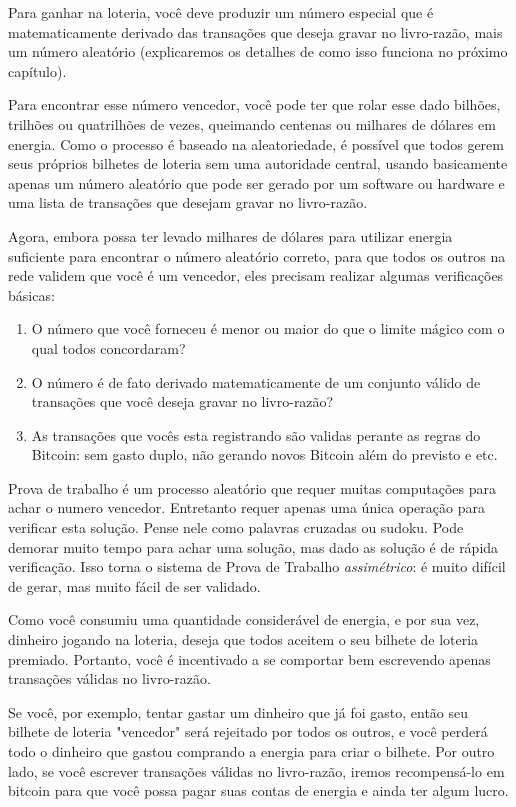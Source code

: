 Para ganhar na loteria, você deve produzir um número especial que é matematicamente derivado das transações que deseja gravar no livro-razão, mais um número aleatório (explicaremos os detalhes de como isso funciona no próximo capítulo).

Para encontrar esse número vencedor, você pode ter que rolar esse dado bilhões, trilhões ou quatrilhões de vezes, queimando centenas ou milhares de dólares em energia. Como o processo é baseado na aleatoriedade, é possível que todos gerem seus próprios bilhetes de loteria sem uma autoridade central, usando basicamente apenas um número aleatório que pode ser gerado por um software ou hardware e uma lista de transações que desejam gravar no livro-razão.

Agora, embora possa ter levado milhares de dólares para utilizar energia suficiente para encontrar o número aleatório correto, para que todos os outros na rede validem que você é um vencedor, eles precisam realizar algumas verificações básicas:

\begin{samepage}
\begin{enumerate}
\item O número que você forneceu é menor ou maior do que o limite mágico com o qual todos concordaram?
\item O número é de fato derivado matematicamente de um conjunto válido de transações que você deseja gravar no livro-razão?
\item As transações que vocês esta registrando são validas perante as regras do Bitcoin: sem gasto duplo, não gerando novos Bitcoin além do previsto e etc.
\end{enumerate}
\end{samepage}
Prova de trabalho é um processo aleatório que requer muitas computações para achar o numero vencedor. Entretanto requer apenas uma única operação para verificar esta solução. Pense nele como palavras cruzadas ou sudoku. Pode demorar muito tempo para achar uma solução, mas dado as solução é de rápida verificação.
Isso torna o sistema de Prova de Trabalho \textit{assimétrico}: é muito difícil de gerar, mas muito fácil de ser validado.

Como você consumiu uma quantidade considerável de energia, e por sua vez, dinheiro jogando na loteria, deseja que todos aceitem o seu bilhete de loteria premiado. Portanto, você é incentivado a se comportar bem escrevendo apenas transações válidas no livro-razão.

Se você, por exemplo, tentar gastar um dinheiro que já foi gasto, então seu bilhete de loteria "vencedor" será rejeitado por todos os outros, e você perderá todo o dinheiro que gastou comprando a energia para criar o bilhete. Por outro lado, se você escrever transações válidas no livro-razão, iremos recompensá-lo em bitcoin para que você possa pagar suas contas de energia e ainda ter algum lucro.

